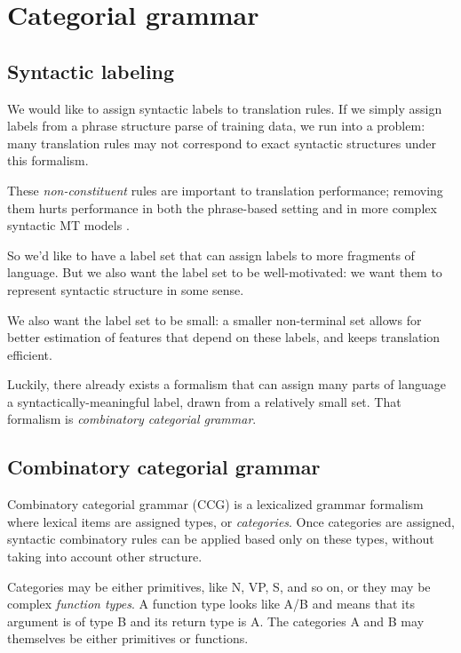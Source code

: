 \documentclass{article}
\begin{document}
\section{Categorial grammar}
\label{sec:cg}

\subsection{Syntactic labeling}

We would like to assign syntactic labels to translation rules. If we simply assign labels from a phrase structure parse of training data, we run into a problem: many translation rules may not correspond to exact syntactic structures under this formalism.

These {\em non-constituent} rules are important to translation performance; removing them hurts performance in both the phrase-based setting \cite{koehn-och-marcu-2003} and in more complex syntactic MT models \cite{deneefe-syntax-and-phrase-mt}.

So we'd like to have a label set that can assign labels to more fragments of language. But we also want the label set to be well-motivated: we want them to represent syntactic structure in some sense.

We also want the label set to be small: a smaller non-terminal set allows for better estimation of features that depend on these labels, and keeps translation efficient.

Luckily, there already exists a formalism that can assign many parts of language a syntactically-meaningful label, drawn from a relatively small set. That formalism is {\em combinatory categorial grammar}.

\subsection{Combinatory categorial grammar}

Combinatory categorial grammar (CCG) is a lexicalized grammar formalism where lexical items are assigned types, or {\em categories}. Once categories are assigned, syntactic combinatory rules can be applied based only on these types, without taking into account other structure.

Categories may be either primitives, like N, VP, S, and so on, or they may be complex {\em function types}. A function type looks like A/B and means that its argument is of type B and its return type is A. The categories A and B may themselves be either primitives or functions.
\end{document}
